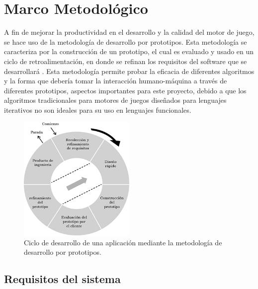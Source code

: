 
\chapter{Marco Metodológico}  %
\label{capitulo3}

\ifpdf
    \graphicspath{{metodologia/Figs/Raster/}{metodologia/Figs/PDF/}{metodologia/Figs/}}
\else
    \graphicspath{{metodologia/Figs/Vector/}{metodologia/Figs/}}
\fi

A fin de mejorar la productividad en el desarrollo y la calidad del motor de juego, se hace uso de la metodología de desarrollo por prototipos. Esta  metodología se caracteriza por la construcción de un prototipo, el cual es evaluado y usado en un ciclo de retroalimentación, en donde se refinan los requisitos del software que se desarrollará \cite{mcconnell2004code}. Esta metodología permite probar la eficacia de diferentes algoritmos y la forma que debería tomar la interacción humano-máquina a través de diferentes prototipos, aspectos importantes para este proyecto, debido a que los algoritmos tradicionales para motores de juegos diseñados para lenguajes iterativos no son ideales para su uso en lenguajes funcionales.

\begin{figure}[!htbp!]
\centering
\includegraphics[width=0.5\textwidth]{metoPrototipo}
\caption[Metodología de desarrollo por prototipos]{Ciclo de desarrollo de una aplicación mediante la metodología de desarrollo por prototipos.}
\end{figure}

\section{Requisitos del sistema}


